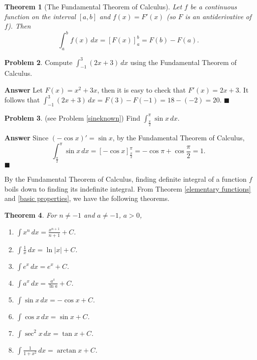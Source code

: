 \documentclass[12pt,letterpaper]{book}
\numberwithin{equation}{section}
\newtheorem{thm}{\textbf{Theorem}}[section]
\theoremstyle{definition}
\newtheorem{problem}[thm]{\textbf{Problem}}
\newenvironment{answer}{\noindent\textbf{Answer}}{\hfill$\blacksquare$\vspace{0.1in}}
\begin{document}
\begin{thm}[The Fundamental Theorem of Calculus] Let $f$ be a continuous function on the interval $[a,b]$ and $f(x)=F'(x)$ (so $F$ is an antiderivative of $f$). Then
$$\int_{a}^b f(x)\,dx=\left[F(x)\right]_a^b=F(b)-F(a).$$
\end{thm}

\begin{problem} Compute $\displaystyle{\int_{-1}^3 (2x+3)\,dx}$ using the Fundamental Theorem of Calculus.
\end{problem}

\begin{answer}
Let $F(x)=x^2+3x$, then it is easy to check that $F'(x)=2x+3.$ It follows that $\displaystyle{\int_{-1}^3 (2x+3)\,dx=F(3)-F(-1)=18-(-2)=20}$.
\end{answer}

\begin{problem} \label{sineverify} (see Problem \ref{sineknown}) Find $\displaystyle{\int_{\frac{\pi}{2}}^\pi \sin x\,dx}$.
\end{problem}

\begin{answer} Since $(-\cos x)'=\sin x $, by the Fundamental Theorem of Calculus,
$$\displaystyle{\int_{\frac{\pi}{2}}^\pi \sin x\,dx=\left[-\cos x\right]_\frac{\pi}{2}^\pi=-\cos \pi +\cos \frac{\pi}{2}=1}.$$
\end{answer}

By the Fundamental Theorem of Calculus, finding definite integral of a function $f$ boils down to finding its indefinite integral. From Theorem \ref{elementary functions} and \ref{basic properties}, we have the following theorems.

\begin{thm} For $n\neq -1$ and $a\neq -1$, $a>0$,
\begin{multicols}{2}
\begin{enumerate}
\item $\displaystyle{\int x^n\,dx=\frac{x^{n+1}}{n+1}+C}$.
\item $\displaystyle{\int \frac{1}{x}\,dx=\ln |x|+C}$.
\item $\displaystyle{\int e^x\,dx=e^x+C}$.
\item $\displaystyle{\int a^x\,dx=\frac{a^x}{\ln a}+C}$.
\item $\displaystyle{\int \sin x\,dx=-\cos x+C}$.
\item $\displaystyle{\int \cos x\,dx=\sin x+C}$.
\item $\displaystyle{\int \sec^2 x\,dx=\tan x+C}$.
\item $\displaystyle{\int \frac{1}{1+x^2} \,dx=\arctan x+C}$.
\end{enumerate}
\end{multicols}
\end{thm}
\end{document}
